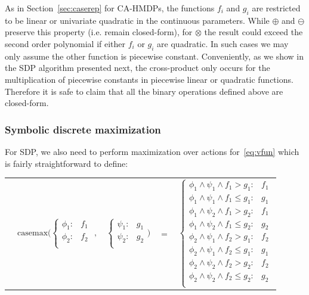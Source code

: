 \documentclass[twoside,11pt]{article}
\newcommand{\casemax}{\mathrm{casemax}}
\begin{document}
As in Section~\ref{sec:caserep} for CA-HMDPs, the functions $f_i$ and $g_i$ are restricted to be linear or univariate quadratic in the continuous parameters. While $\oplus$ and $\ominus$ preserve this property (i.e. remain closed-form), for $\otimes$ the result could exceed the second order polynomial if either $f_i$ or $g_i$ are quadratic. In such cases we may only assume the other function is piecewise constant. Conveniently, as we show in the SDP algorithm presented next, the cross-product only occurs for the multiplication of piecewise constants in piecewise linear or quadratic functions. Therefore it is safe to claim that all the binary operations defined above are closed-form.


\subsubsection*{Symbolic discrete maximization}
For SDP, we also need to perform maximization over actions for~\eqref{eq:vfun} which is fairly straightforward
to define:

{%
\begin{center}
\begin{tabular}{r c c c l}
&
\hspace{-9mm} $\casemax \Bigg(
  \begin{cases}
    \phi_1: & f_1 \\ 
    \phi_2: & f_2 \\ 
  \end{cases}$
$,$
&
\hspace{-4mm}
  $\begin{cases}
    \psi_1: & g_1 \\ 
    \psi_2: & g_2 \\ 
  \end{cases} \Bigg)$
&
\hspace{-4mm} 
$ = $
&
\hspace{-4mm}
  $\begin{cases}
  \phi_1 \wedge \psi_1 \wedge f_1 > g_1    : & f_1 \\ 
  \phi_1 \wedge \psi_1 \wedge f_1 \leq g_1 : & g_1 \\ 
  \phi_1 \wedge \psi_2 \wedge f_1 > g_2    : & f_1 \\ 
  \phi_1 \wedge \psi_2 \wedge f_1 \leq g_2 : & g_2 \\ 
  \phi_2 \wedge \psi_1 \wedge f_2 > g_1    : & f_2 \\ 
  \phi_2 \wedge \psi_1 \wedge f_2 \leq g_1 : & g_1 \\ 
  \phi_2 \wedge \psi_2 \wedge f_2 > g_2    : & f_2 \\ 
  \phi_2 \wedge \psi_2 \wedge f_2 \leq g_2 : & g_2 \\ 
  \end{cases}$\label{symbolicMax}
\end{tabular}
\end{center}
}
\end{document}
